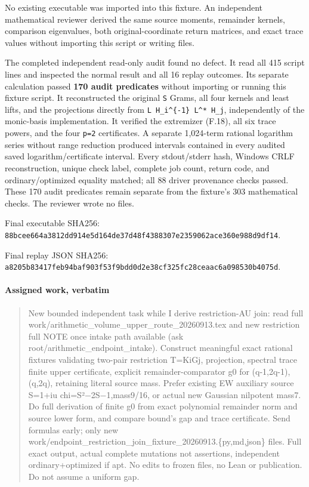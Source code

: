 No existing executable was imported into this fixture. An independent mathematical reviewer derived the same source moments, remainder kernels, comparison eigenvalues, both original-coordinate return matrices, and exact trace values without importing this script or writing files.

The completed independent read-only audit found no defect. It read all 415 script lines and inspected the normal result and all 16 replay outcomes. Its separate calculation passed \textbf{170 audit predicates} without importing or running this fixture script. It reconstructed the original \nolinkurl{S} Grams, all four kernels and least lifts, and the projections directly from \texttt{L\ H\_i\^{}\{-1\}\ L\^{}*\ H\_j}, independently of the monic-basis implementation. It verified the extremizer (F.18), all six trace powers, and the four \nolinkurl{p=2} certificates. A separate 1,024-term rational logarithm series without range reduction produced intervals contained in every audited saved logarithm/certificate interval. Every stdout/stderr hash, Windows CRLF reconstruction, unique check label, complete job count, return code, and ordinary/optimized equality matched; all 88 driver provenance checks passed. These 170 audit predicates remain separate from the fixture's 303 mathematical checks. The reviewer wrote no files.

Final executable SHA256: \nolinkurl{88bcee664a3812dd914e5d164de37d48f4388307e2359062ace360e988d9df14}.

Final replay JSON SHA256: \nolinkurl{a8205b83417feb94baf903f53f9bdd0d2e38cf325fc28ceaac6a098530b4075d}.

\paragraph{Assigned work, verbatim}\label{endpoint-restriction_fixture--assigned-work-verbatim}

\begin{quote}
New bounded independent task while I derive restriction-AU join: read full work/arithmetic\_volume\_upper\_route\_20260913.tex and new restriction full NOTE once intake path available (ask root/arithmetic\_endpoint\_intake). Construct meaningful exact rational fixtures validating two-pair restriction T=KiGj, projection, spectral trace finite upper certificate, explicit remainder-comparator g0 for (q-1,2q-1),(q,2q), retaining literal source mass. Prefer existing EW auxiliary source S=1+iu chi=S²−2S−1,mass9/16, or actual new Gaussian nilpotent mass7. Do full derivation of finite g0 from exact polynomial remainder norm and source lower form, and compare bound's gap and trace certificate. Send formulas early; only new work/endpoint\_restriction\_join\_fixture\_20260913.\{py,md,json\} files. Full exact output, actual complete mutations not assertions, independent ordinary+optimized if apt. No edits to frozen files, no Lean or publication. Do not assume a uniform gap.
\end{quote}

